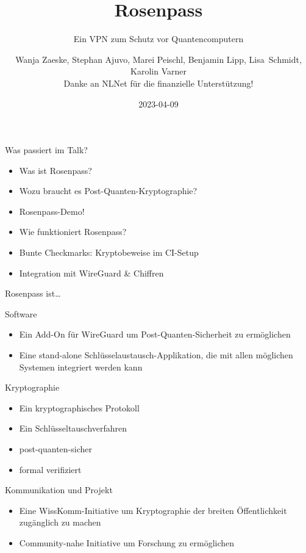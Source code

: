 \documentclass[german]{rosenpass-beamer}
\title{Rosenpass}
\subtitle{Ein VPN zum Schutz vor Quantencomputern}
\author{
Wanja Zaeske, Stephan Ajuvo, Marei Peischl, Benjamin Lipp, Lisa~Schmidt, Karolin Varner
\\ \scriptsize Danke an NLNet für die finanzielle Unterstützung!
}
\institute{\url{https://rosenpass.eu}}
\date{2023-04-09}
\begin{document}
\maketitle

\begin{frame}{Was passiert im Talk?}
\begin{itemize}
  \item Was ist Rosenpass?
  \item Wozu braucht es Post-Quanten-Kryptographie?
  \item Rosenpass-Demo!
  \item Wie funktioniert Rosenpass?
  \item Bunte Checkmarks: Kryptobeweise im CI-Setup
  \item Integration mit WireGuard \& Chiffren
\end{itemize}
\end{frame}

\begin{frame}{Rosenpass ist…}
\setlength{\leftmargini}{2em}

	Software
\begin{itemize}
  \item Ein Add-On für WireGuard um Post-Quanten-Sicherheit zu ermöglichen
  \item Eine stand-alone Schlüsselaustausch-Applikation, die mit allen möglichen Systemen integriert werden kann
\end{itemize}

Kryptographie
\begin{itemize}
  \item Ein kryptographisches Protokoll
  \item Ein Schlüsseltauschverfahren
  \item post-quanten-sicher
  \item formal verifiziert
\end{itemize}

Kommunikation und Projekt
\begin{itemize}
  \item Eine WissKomm-Initiative um Kryptographie der breiten Öffentlichkeit zugänglich zu machen
  \item Community-nahe Initiative um Forschung zu ermöglichen
\end{itemize}
\end{frame}

\end{document}
